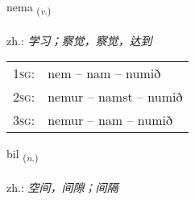 \documentclass[frontgrid, backgrid]{flacards}\usepackage[]{graphicx}\usepackage[]{xcolor}
\begin{document}
\renewcommand{\flhead}{\vskip5pt \fboxsep=0pt {\small\bfseries\footnotesize Sagnorð | 动词}}
\renewcommand{\fcfoot}{\vskip5pt \fboxsep=0pt \hspace{2pt}{\small\bfseries\footnotesize 1K}}

\renewcommand{\blhead}{\vskip5pt {\small\bfseries\footnotesize Sagnorð | 动词 }}
\renewcommand{\bcfoot}{\vskip5pt \hspace{2pt}{\small\bfseries\footnotesize 1K}}


{nema \small{\textsubscript{(\textit{v.})}} \\[1ex] %
\textphonetic{[nɛːma]} \\
zh.: \emph{学习；察觉，察觉，达到} \\  [2ex]
\renewcommand*{\arraystretch}{0.8}
\begin{tabular}{p{1cm}l}
\textsc{1sg}: & nem -- nam -- numið \\ 
\textsc{2sg}: & nemur -- namst -- numið \\ 
\textsc{3sg}: & nemur -- nam -- numið \\ 
\end{tabular}
}

\renewcommand{\flhead}{\vskip5pt \fboxsep=0pt {\small\bfseries\footnotesize Nafnorð | 名词}}
\renewcommand{\fcfoot}{\vskip5pt \fboxsep=0pt \hspace{2pt}{\small\bfseries\footnotesize 1K}}

\renewcommand{\blhead}{\vskip5pt {\small\bfseries\footnotesize Nafnorð | 名词 }}
\renewcommand{\bcfoot}{\vskip5pt \hspace{2pt}{\small\bfseries\footnotesize 1K}}


{bil \small{\textsubscript{(\textit{n.})}} \\[1ex] %
\textphonetic{[pɪːl]} \\
zh.: \emph{空间，间隙；间隔} \\  [2ex]
\renewcommand*{\arraystretch}{0.8}
}
\end{document}
